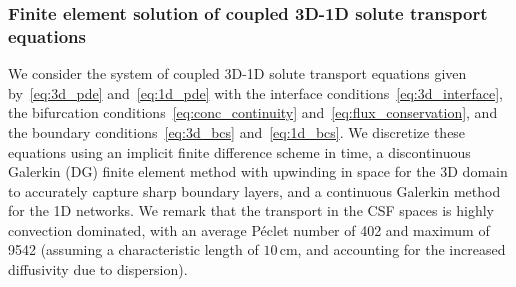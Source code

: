 \documentclass[fleqn,10pt]{wlscirep}
\begin{document}
\subsubsection{Finite element solution of coupled 3D-1D solute transport equations}
We consider the system of coupled 3D-1D solute transport equations
given by~\eqref{eq:3d_pde} and~\eqref{eq:1d_pde} with the interface
conditions~\eqref{eq:3d_interface}, the bifurcation
conditions~\eqref{eq:conc_continuity}
and~\eqref{eq:flux_conservation}, and the boundary
conditions~\eqref{eq:3d_bcs} and~\eqref{eq:1d_bcs}. We discretize
these equations using an implicit finite difference scheme in time, 
a discontinuous Galerkin (DG) finite element method with upwinding in space for the 3D domain to accurately capture sharp boundary layers, and a continuous Galerkin method for the 1D networks. We remark that the transport in the CSF spaces is highly convection dominated, with an average Péclet number of 402 and maximum of 9542 (assuming a characteristic length of $10\,$cm, and accounting for the increased diffusivity due to dispersion).
\end{document}
